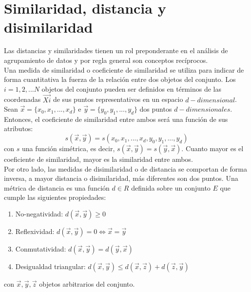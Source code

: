 \section{Similaridad, distancia y disimilaridad}
Las distancias y similaridades tienen un rol preponderante en el análisis de agrupamiento de datos y por regla general son conceptos recíprocos.\\
Una medida de similaridad o coeficiente de similaridad se utiliza para indicar de forma cuantitativa la fuerza de la relación entre dos objetos del conjunto. Los $i = 1, 2, ...N$ objetos del conjunto pueden ser definidos en términos de las coordenadas $\vec{Xi}$ de sus puntos representativos en un espacio $d-dimensional$. Sean $\vec{x}=\{x_0, x_1,...,x_d\}$ e $\vec{y}=\{y_0, y_1,...,y_d\}$ dos puntos $d-dimensionales$. Entonces, el coeficiente de similaridad entre ambos será una función de sus atributos:
\begin{equation}
	s(\vec{x}, \vec{y}) = s(x_0, x_1,...,x_d, y_0, y_1,...,y_d)
\end{equation}
con $s$ una función simétrica, es decir, $s(\vec{x}, \vec{y}) = s(\vec{y}, \vec{x})$. Cuanto mayor es el coeficiente de similaridad, mayor es la similaridad entre ambos.\\
Por otro lado, las medidas de disimilaridad o de distancia se comportan de forma inversa, a mayor distancia o disimilaridad, más diferentes son dos puntos.
Una métrica de distancia es una función $d \in R$ definida sobre un conjunto $E$ que cumple las siguientes propiedades:
\begin{enumerate}
\item No-negatividad: $d(\vec{x}, \vec{y}) \geq 0$
\item Reflexividad: $d(\vec{x}, \vec{y}) = 0 \iff \vec{x} = \vec{y}$
\item Conmutatividad: $d(\vec{x}, \vec{y}) = d(\vec{y}, \vec{x})$
\item Desigualdad triangular: $d(\vec{x}, \vec{y}) \leq d(\vec{x}, \vec{z}) + d(\vec{z}, \vec{y})$
\end{enumerate}
con $\vec{x},\vec{y},\vec{z}$ objetos arbitrarios del conjunto.\\

